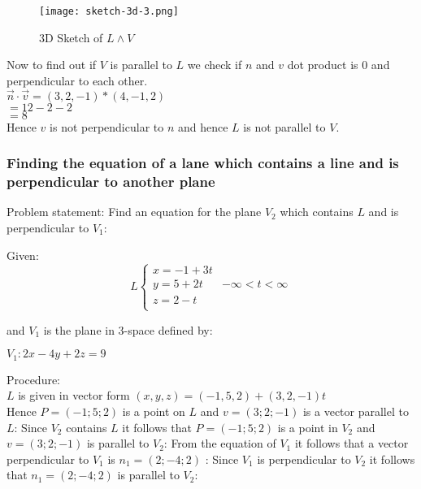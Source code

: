 \begin{figure}[H]
\centering
\texttt{[image: sketch-3d-3.png]}
\caption{3D Sketch of $L \land V$}
\label{fig:Plane_3D_worked_3}
\end{figure}

Now to find out if $V$ is parallel to $L$ we check if $n$ and $v$ dot product is 0 and perpendicular to each other. \\

$\vec{n}\cdot \vec{v} = (3,2,-1)*(4,-1,2)$ \\

$= 12-2-2 $ \\

$= 8$ \\

Hence $v$ is not perpendicular to $n$ and hence $L$ is not parallel to $V$.

\subsubsection{Finding the equation of a lane which contains a line and is perpendicular to another plane}
Problem statement: Find an equation for the plane $V_2$ which contains $L$ and is perpendicular to $V_1$:

Given: \\

\[ L
\begin{cases}
x = -1+3t \\
y = 5+2t & -\infty < t < \infty \\
z = 2-t \\
\end{cases}
\]

and $V_1$ is the plane in 3-space defined by: \\
\begin{center}
$V_1: 2x-4y+2z=9$
\end{center}

Procedure: \\

$L$ is given in vector form $(x,y,z) = (-1,5,2) + (3,2,-1)t$ \\ 

Hence $P = (-1; 5; 2)$ is a point on $L$ and $v = (3; 2;-1)$ is a vector parallel to $L$: Since $V_2$ contains $L$ it
follows that $P = (-1; 5; 2)$ is a point in $V_2$ and $v = (3; 2;-1)$ is parallel to $V_2$:
From the equation of $V_1$ it follows that a vector perpendicular to $V_1$ is $n_1 = (2;-4; 2)$ :
Since $V_1$ is perpendicular to $V_2$ it follows that $n_1 = (2;-4; 2)$ is parallel to $V_2$:


